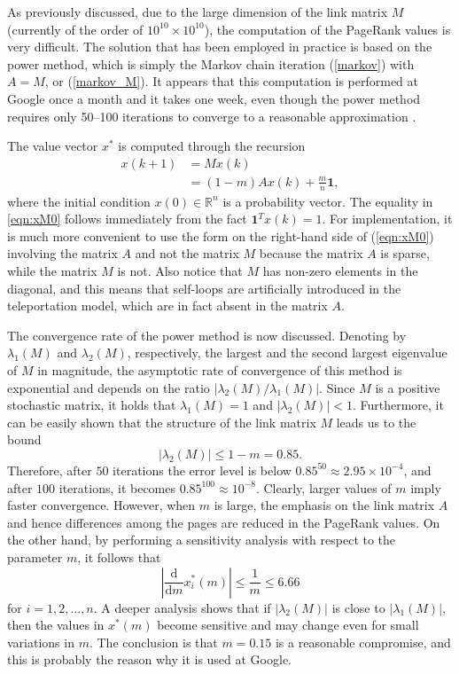\documentclass[11pt,draftcls,onecolumn]{IEEEtran}
\newcommand{\field}[1]{{\mathbb{#1}}}
\newcommand{\one}{\mathbf{1}}
\newcommand{\R}{\field{R}}
\begin{document}
As previously discussed, due to the large dimension of the link matrix $M$ (currently of 
the order of $10^{10} \times 10^{10}$), the computation of the PageRank values is very difficult. 
The solution that has been employed in practice 
is based on the power method, which is simply the Markov chain iteration (\ref{markov}) with $A=M$,
or (\ref{markov_M}).
It appears that this computation is performed at Google once a month and it takes one week, 
even though the power method requires only 50--100 iterations
to converge to a reasonable approximation \cite{LanMey:06}.  

The value vector $x^*$ is computed through the recursion 
\begin{align}
x(k+1) 
  &= M x(k) \nonumber\\
  &= (1-m)A x(k) + \frac{m}{n}\one,
    \label{eqn:xM0} 
\end{align}
where the initial condition $x(0)\in \R^n$ is a probability vector.  
The equality in \eqref{eqn:xM0} follows immediately from the fact 
$\one^Tx(k)=1$.
For implementation, it is much more convenient to use the form 
on the right-hand side of 
(\ref{eqn:xM0}) involving the matrix $A$ and not the matrix $M$ because the matrix 
$A$ is sparse, while the matrix $M$ is not. Also notice that $M$ has non-zero elements 
in the diagonal, and this means that self-loops are artificially introduced in 
the teleportation model, which are in fact absent in the matrix $A$.

The convergence rate of the power method is now discussed.
Denoting by $\lambda_1(M)$ and $\lambda_2(M)$, respectively,  
the largest and the second largest eigenvalue of $M$ 
in magnitude, the asymptotic rate of convergence of this method is exponential and
depends on the ratio $|\lambda_2(M)/\lambda_1(M)|$.
Since $M$ is a positive stochastic matrix, 
it holds that $\lambda_1(M)=1$ and $|\lambda_2(M)|<1$.
Furthermore, it can be easily shown that 
the structure of the link matrix $M$ leads us to the bound 
\begin{equation*}
|\lambda_2(M)| \leq 1-m = 0.85.
\end{equation*}
Therefore, after $50$ iterations the error level is below 
$0.85^{50} \approx 2.95\times 10^{-4}$, and 
after $100$ iterations, it becomes $0.85^{100} \approx 10^{-8}$.
Clearly, larger values of $m$ imply faster convergence. 
However, when $m$ is large, the emphasis on the link matrix $A$ 
and hence differences among the pages are reduced in the PageRank values. 
On the other hand, 
by performing a sensitivity analysis with respect to the parameter $m$, 
it follows that
$$
\left|\frac{{\mathrm d}}{{\mathrm d} m} x_i^*(m)\right| \le \frac{1}{m} \le 6.66
$$
for $i=1,2, \ldots,n$. A deeper analysis \cite{LanMey:06} shows that if $|\lambda_2(M)|$ 
is close to $|\lambda_1(M)|$, then 
the values in $x^*(m)$ become sensitive and may change even for small 
variations in $m$.
The conclusion is that $m=0.15$ is a reasonable compromise, 
and this is probably the reason why it is used at Google.
\end{document}

